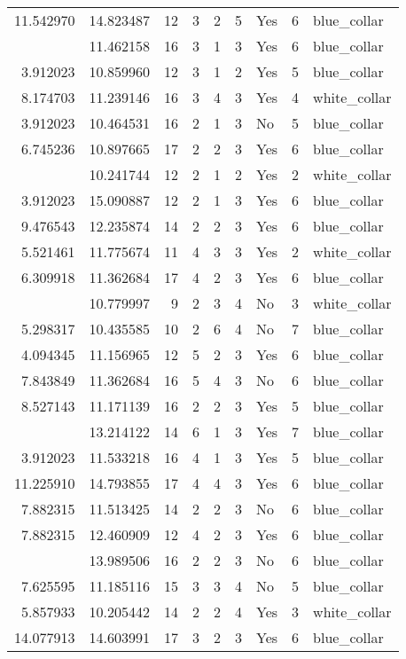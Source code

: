 \documentclass[
]{article}
\begin{document}
\begin{longtable}[t]{rrrrrllrl}
11.542970 & 14.823487 & 12 & 3 & 2 & 5 & Yes & 6 & blue\_collar\\
\addlinespace
3.912023 & 11.462158 & 16 & 3 & 1 & 3 & Yes & 6 & blue\_collar\\
3.912023 & 10.859960 & 12 & 3 & 1 & 2 & Yes & 5 & blue\_collar\\
8.174703 & 11.239146 & 16 & 3 & 4 & 3 & Yes & 4 & white\_collar\\
3.912023 & 10.464531 & 16 & 2 & 1 & 3 & No & 5 & blue\_collar\\
6.745236 & 10.897665 & 17 & 2 & 2 & 3 & Yes & 6 & blue\_collar\\
\addlinespace
3.912023 & 10.241744 & 12 & 2 & 1 & 2 & Yes & 2 & white\_collar\\
3.912023 & 15.090887 & 12 & 2 & 1 & 3 & Yes & 6 & blue\_collar\\
9.476543 & 12.235874 & 14 & 2 & 2 & 3 & Yes & 6 & blue\_collar\\
5.521461 & 11.775674 & 11 & 4 & 3 & 3 & Yes & 2 & white\_collar\\
6.309918 & 11.362684 & 17 & 4 & 2 & 3 & Yes & 6 & blue\_collar\\
\addlinespace
6.684612 & 10.779997 & 9 & 2 & 3 & 4 & No & 3 & white\_collar\\
5.298317 & 10.435585 & 10 & 2 & 6 & 4 & No & 7 & blue\_collar\\
4.094345 & 11.156965 & 12 & 5 & 2 & 3 & Yes & 6 & blue\_collar\\
7.843849 & 11.362684 & 16 & 5 & 4 & 3 & No & 6 & blue\_collar\\
8.527143 & 11.171139 & 16 & 2 & 2 & 3 & Yes & 5 & blue\_collar\\
\addlinespace
3.912023 & 13.214122 & 14 & 6 & 1 & 3 & Yes & 7 & blue\_collar\\
3.912023 & 11.533218 & 16 & 4 & 1 & 3 & Yes & 5 & blue\_collar\\
11.225910 & 14.793855 & 17 & 4 & 4 & 3 & Yes & 6 & blue\_collar\\
7.882315 & 11.513425 & 14 & 2 & 2 & 3 & No & 6 & blue\_collar\\
7.882315 & 12.460909 & 12 & 4 & 2 & 3 & Yes & 6 & blue\_collar\\
\addlinespace
11.884834 & 13.989506 & 16 & 2 & 2 & 3 & No & 6 & blue\_collar\\
7.625595 & 11.185116 & 15 & 3 & 3 & 4 & No & 5 & blue\_collar\\
5.857933 & 10.205442 & 14 & 2 & 2 & 4 & Yes & 3 & white\_collar\\
14.077913 & 14.603991 & 17 & 3 & 2 & 3 & Yes & 6 & blue\_collar\\

\end{longtable}
\end{document}
